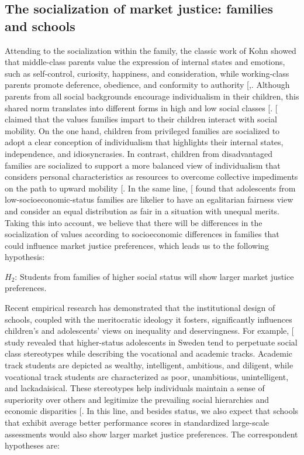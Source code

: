 \documentclass[
  12pt,
  letterpaper,
]{article}
\begin{document}
\subsection{The socialization of market justice: families and
schools}\label{the-socialization-of-market-justice-families-and-schools}

Attending to the socialization within the family, the classic work of
Kohn showed that middle-class parents value the expression of internal
states and emotions, such as self-control, curiosity, happiness, and
consideration, while working-class parents promote deference, obedience,
and conformity to authority
{[},\citeproc{ref-kohn_class_1969}{67}{]}.
Although parents from all social backgrounds encourage individualism in
their children, this shared norm translates into different forms in high
and low social classes {[}\citeproc{ref-kohn_class_1969}{67}{]}.
{[}\citeproc{ref-acemoglu_obedience_2021}{68}{]} claimed that the values
families impart to their children interact with social mobility. On the
one hand, children from privileged families are socialized to adopt a
clear conception of individualism that highlights their internal states,
independence, and idiosyncrasies. In contrast, children from
disadvantaged families are socialized to support a more balanced view of
individualism that considers personal characteristics as resources to
overcome collective impediments on the path to upward mobility
{[}\citeproc{ref-iacoviello_collectivism_2019}{69}{]}. In the same line,
{[}\citeproc{ref-almas_fairness_2017}{70}{]} found that adolescents from
low-socioeconomic-status families are likelier to have an egalitarian
fairness view and consider an equal distribution as fair in a situation
with unequal merits. Taking this into account, we believe that there
will be differences in the socialization of values according to
socioeconomic differences in families that could influence market
justice preferences, which leads us to the following hypothesis:

\(H_2\): Students from families of higher social status will show larger
market justice preferences.

Recent empirical research has demonstrated that the institutional design
of schools, coupled with the meritocratic ideology it fosters,
significantly influences children's and adolescents' views on inequality
and deservingness. For example,
{[}\citeproc{ref-jonsson_institutional_2015}{71}{]} study revealed that
higher-status adolescents in Sweden tend to perpetuate social class
stereotypes while describing the vocational and academic tracks.
Academic track students are depicted as wealthy, intelligent, ambitious,
and diligent, while vocational track students are characterized as poor,
unambitious, unintelligent, and lackadaisical. These stereotypes help
individuals maintain a sense of superiority over others and legitimize
the prevailing social hierarchies and economic disparities
{[}\citeproc{ref-jost_attitudinal_2000}{72}{]}. In this line, and
besides status, we also expect that schools that exhibit average better
performance scores in standardized large-scale assessments would also
show larger market justice preferences. The correspondent hypotheses
are:
\end{document}
